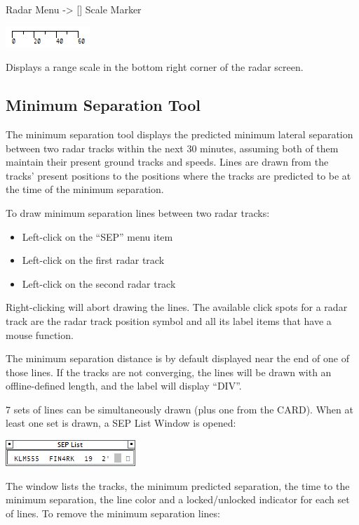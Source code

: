 \documentclass[11pt,a4paper,oldfontcommands]{memoir}
\begin{document}
Radar Menu -> [] Scale Marker

\includegraphics{img/scale.png}

Displays a range scale in the bottom right corner of the radar screen.

\subsection{Minimum Separation Tool}
\label{mmtool}

The minimum separation tool displays the predicted minimum lateral separation between two radar tracks within the next 30 minutes, assuming both of them maintain their present ground tracks and speeds. Lines are drawn from the tracks’ present positions to the positions where the tracks are predicted to be at the time of the minimum separation.

To draw minimum separation lines between two radar tracks:
\begin{itemize}
    \item Left-click on the “SEP” menu item
    \item Left-click on the first radar track
    \item Left-click on the second radar track
\end{itemize}

Right-clicking will abort drawing the lines. The available click spots for a radar track are the radar track position symbol and all its label items that have a mouse function.

The minimum separation distance is by default displayed near the end of one of those lines. If the tracks are not converging, the lines will be drawn with an offline-defined length, and the label will display “DIV”.

7 sets of lines can be simultaneously drawn (plus one from the CARD). When at least one set is drawn, a SEP List Window is opened:

\includegraphics{img/seplist.png}

The window lists the tracks, the minimum predicted separation, the time to the minimum separation, the line color and a locked/unlocked indicator for each set of lines.
To remove the minimum separation lines:
\end{document}
